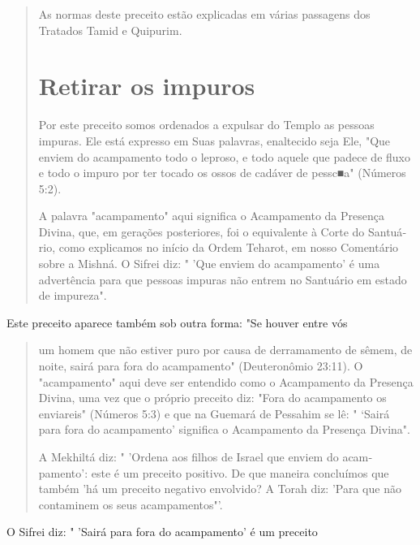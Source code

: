 \begin{quote}
As normas deste preceito estão explicadas em várias passagens dos
Tratados Tamid e Quipurim.

\section{Retirar os impuros}

Por este preceito somos ordenados a expulsar do Templo as pessoas
impuras. Ele está expresso em Suas palavras, enaltecido seja Ele, "Que
enviem do acampamento todo o leproso, e todo aquele que padece de fluxo
e todo o impuro por ter tocado os ossos de cadáver de pessc■a" (Números
5:2).

A palavra "acampamento" aqui significa o Acampamento da Presen­ça
Divina, que, em gerações posteriores, foi o equivalente à Corte do
Santuá­rio, como explicamos no início da Ordem Teharot, em nosso
Comentário so­bre a Mishná. O Sifrei diz: " 'Que enviem do acampamento'
é uma advertência para que pessoas impuras não entrem no Santuário em
estado de impureza".
\end{quote}

Este preceito aparece também sob outra forma: "Se houver entre vós

\begin{quote}um homem que não estiver puro por causa de derramamento de sêmem, de
noite, sairá para fora do acampamento" (Deuteronômio 23:11). O
"acampamen­to" aqui deve ser entendido como o Acampamento da Presença
Divina, uma vez que o próprio preceito diz: "Fora do acampamento os
enviareis" (Núme­ros 5:3) e que na Guemará de Pessahim se lê: " `Sairá
para fora do acampamen­to' significa o Acampamento da Presença Divina".

A Mekhiltá diz: " 'Ordena aos filhos de Israel que enviem do
acam­pamento': este é um preceito positivo. De que maneira concluímos
que tam­bém 'há um preceito negativo envolvido? A Torah diz: 'Para que
não contami­nem os seus acampamentos"'.
\end{quote}

O Sifrei diz: " 'Sairá para fora do acampamento' é um preceito

